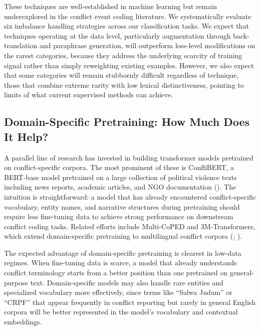 \documentclass[
  11pt,
]{article}
\begin{document}
These techniques are well-established in machine learning but remain
underexplored in the conflict event coding literature. We systematically
evaluate six imbalance handling strategies across our classification
tasks. We expect that techniques operating at the data level,
particularly augmentation through back-translation and paraphrase
generation, will outperform loss-level modifications on the rarest
categories, because they address the underlying scarcity of training
signal rather than simply reweighting existing examples. However, we
also expect that some categories will remain stubbornly difficult
regardless of technique, those that combine extreme rarity with low
lexical distinctiveness, pointing to limits of what current supervised
methods can achieve.

\subsection{Domain-Specific Pretraining: How Much Does It
Help?}\label{domain-specific-pretraining-how-much-does-it-help}

A parallel line of research has invested in building transformer models
pretrained on conflict-specific corpora. The most prominent of these is
ConfliBERT, a BERT-base model pretrained on a large collection of
political violence texts including news reports, academic articles, and
NGO documentation (). The intuition
is straightforward: a model that has already encountered
conflict-specific vocabulary, entity names, and narrative structures
during pretraining should require less fine-tuning data to achieve
strong performance on downstream conflict coding tasks. Related efforts
include Multi-CoPED and 3M-Transformers, which extend domain-specific
pretraining to multilingual conflict corpora
(;
).

The expected advantage of domain-specific pretraining is clearest in
low-data regimes. When fine-tuning data is scarce, a model that already
understands conflict terminology starts from a better position than one
pretrained on general-purpose text. Domain-specific models may also
handle rare entities and specialized vocabulary more effectively, since
terms like ``Salwa Judum'' or ``CRPF'' that appear frequently in
conflict reporting but rarely in general English corpora will be better
represented in the model's vocabulary and contextual embeddings.
\end{document}
